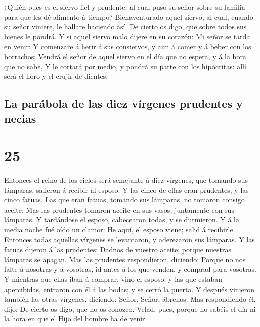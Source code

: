  ¿Quién pues es el siervo fiel y prudente, al cual puso
su señor sobre su familia para que les dé alimento á tiempo?
 Bienaventurado aquel siervo, al cual, cuando su señor
viniere, le hallare haciendo así.  De cierto os digo, que
sobre todos sus bienes le pondrá.  Y si aquel siervo malo
dijere en su corazón: Mi señor se tarda en venir:  Y
comenzare á herir á sus consiervos, y aun á comer y á beber con los
borrachos;  Vendrá el señor de aquel siervo en el día que
no espera, y á la hora que no sabe,  Y le cortará por
medio, y pondrá su parte con los hipócritas: allí será el lloro y el
crujir de dientes.

\hypertarget{la-paruxe1bola-de-las-diez-vuxedrgenes-prudentes-y-necias}{%
\subsection{La parábola de las diez vírgenes prudentes y
necias}\label{la-paruxe1bola-de-las-diez-vuxedrgenes-prudentes-y-necias}}

\hypertarget{section-24}{%
\section{25}\label{section-24}}

 Entonces el reino de los cielos será semejante á diez
vírgenes, que tomando sus lámparas, salieron á recibir al esposo.
 Y las cinco de ellas eran prudentes, y las cinco fatuas.
 Las que eran fatuas, tomando sus lámparas, no tomaron
consigo aceite;  Mas las prudentes tomaron aceite en sus
vasos, juntamente con sus lámparas.  Y tardándose el
esposo, cabecearon todas, y se durmieron.  Y á la media
noche fué oído un clamor: He aquí, el esposo viene; salid á recibirle.
 Entonces todas aquellas vírgenes se levantaron, y
aderezaron sus lámparas.  Y las fatuas dijeron á las
prudentes: Dadnos de vuestro aceite; porque nuestras lámparas se apagan.
 Mas las prudentes respondieron, diciendo: Porque no nos
falte á nosotras y á vosotras, id antes á los que venden, y comprad para
vosotras.  Y mientras que ellas iban á comprar, vino el
esposo; y las que estaban apercibidas, entraron con él á las bodas; y se
cerró la puerta.  Y después vinieron también las otras
vírgenes, diciendo: Señor, Señor, ábrenos.  Mas
respondiendo él, dijo: De cierto os digo, que no os conozco.
 Velad, pues, porque no sabéis el día ni la hora en que
el Hijo del hombre ha de venir.

